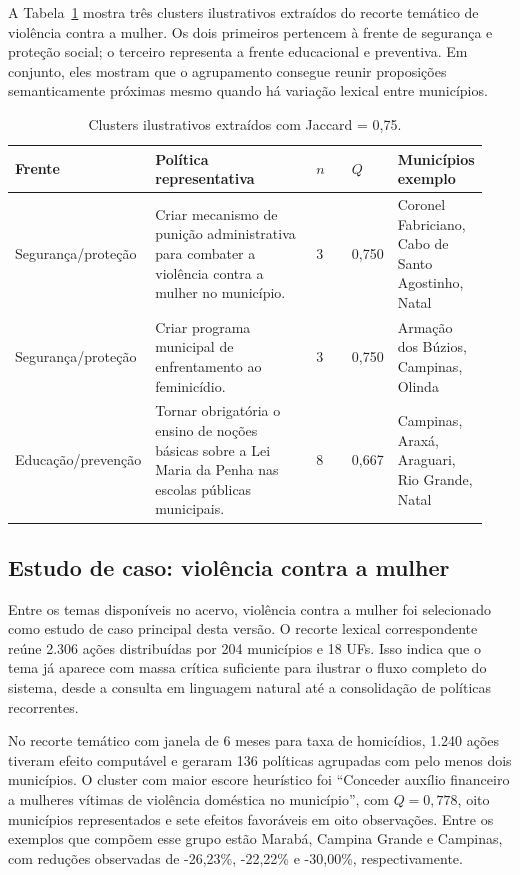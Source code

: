 A Tabela~\ref{tab:clusters-v2} mostra três clusters ilustrativos extraídos do recorte temático de violência contra a mulher. Os dois primeiros pertencem à frente de segurança e proteção social; o terceiro representa a frente educacional e preventiva. Em conjunto, eles mostram que o agrupamento consegue reunir proposições semanticamente próximas mesmo quando há variação lexical entre municípios.

\begin{table}[t]
\centering
\caption{Clusters ilustrativos extraídos com Jaccard = 0,75.}
\label{tab:clusters-v2}
\small
\begin{tabular}{p{0.18\linewidth} p{0.43\linewidth} p{0.10\linewidth} p{0.09\linewidth} p{0.14\linewidth}}
\toprule
Frente & Política representativa & $n$ & $Q$ & Municípios exemplo \\
\midrule
Segurança/proteção & Criar mecanismo de punição administrativa para combater a violência contra a mulher no município. & 3 & 0,750 & Coronel Fabriciano, Cabo de Santo Agostinho, Natal \\
Segurança/proteção & Criar programa municipal de enfrentamento ao feminicídio. & 3 & 0,750 & Armação dos Búzios, Campinas, Olinda \\
Educação/prevenção & Tornar obrigatória o ensino de noções básicas sobre a Lei Maria da Penha nas escolas públicas municipais. & 8 & 0,667 & Campinas, Araxá, Araguari, Rio Grande, Natal \\
\bottomrule
\end{tabular}
\end{table}

\subsection{Estudo de caso: violência contra a mulher}

Entre os temas disponíveis no acervo, violência contra a mulher foi selecionado como estudo de caso principal desta versão. O recorte lexical correspondente reúne 2.306 ações distribuídas por 204 municípios e 18 UFs. Isso indica que o tema já aparece com massa crítica suficiente para ilustrar o fluxo completo do sistema, desde a consulta em linguagem natural até a consolidação de políticas recorrentes.

No recorte temático com janela de 6 meses para taxa de homicídios, 1.240 ações tiveram efeito computável e geraram 136 políticas agrupadas com pelo menos dois municípios. O cluster com maior escore heurístico foi ``Conceder auxílio financeiro a mulheres vítimas de violência doméstica no município'', com $Q=0,778$, oito municípios representados e sete efeitos favoráveis em oito observações. Entre os exemplos que compõem esse grupo estão Marabá, Campina Grande e Campinas, com reduções observadas de -26,23\%, -22,22\% e -30,00\%, respectivamente.

